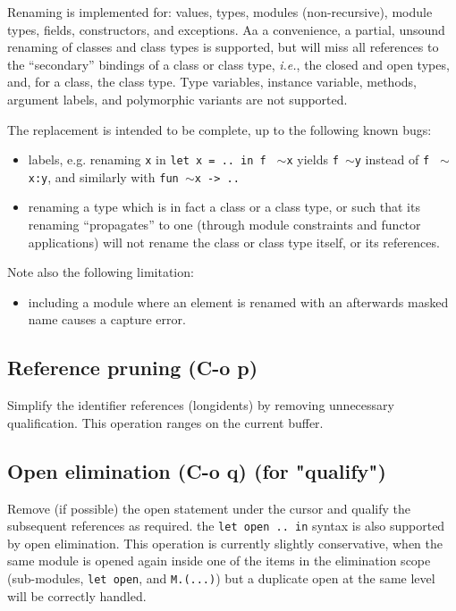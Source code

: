 Renaming is implemented for: values, types, modules (non-recursive),
module types, fields, constructors, and exceptions. Aa a convenience,
a partial, unsound renaming of classes and class types is supported,
but will miss all references to the ``secondary'' bindings of a class
or class type, \emph{i.e.}, the closed and open types, and, for a
class, the class type. Type variables, instance variable, methods,
argument labels, and polymorphic variants are not supported.

The replacement is intended to be complete, up to the following known
bugs:
\begin{itemize}
\item labels, e.g. renaming \verb!x! in \verb!let x = .. in f !%
  $\sim$\verb!x! yields \verb!f !$\sim$\verb!y! instead of \verb!f !%
  $\sim$\verb!x:y!, and similarly with \verb!fun !$\sim$\verb!x -> ..!
  \item renaming a type which is in fact a class or a class type, or
    such that its renaming ``propagates'' to one (through module
    constraints and functor applications) will not rename the class or
    class type itself, or its references.
\end{itemize}
Note also the following limitation:
\begin{itemize}
  \item including a module where an element is renamed with an afterwards masked
    name causes a capture error.
\end{itemize}


\subsection{Reference pruning (C-o p)}
Simplify the identifier references (longidents) by removing unnecessary
qualification. This operation ranges on the current buffer.

\subsection{Open elimination (C-o q) (for "qualify")}
Remove (if possible) the open statement under the cursor and qualify
the subsequent references as required. the \verb!let open .. in!
syntax is also supported by open elimination. This operation is
currently slightly conservative, when the same module is opened again
inside one of the items in the elimination scope (sub-modules,
\verb!let open!, and \verb!M.(...)!) but a duplicate open at the same
level will be correctly handled.

